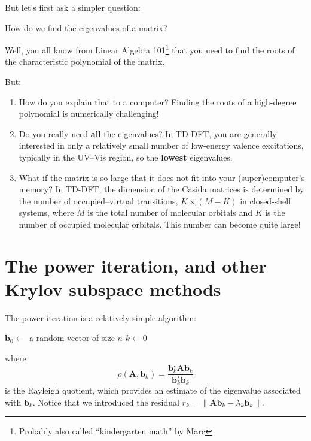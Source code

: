 \documentclass[10pt,aspectratio=169]{beamer}
\begin{document}
\begin{frame}
	But let's first ask a simpler question:
	\begin{center}
		\Large How do we find the eigenvalues of a matrix?
	\end{center}
	\pause
	Well, you all know from Linear Algebra 101\footnote{Probably also called ``kindergarten math'' by Marc} that you need to find the roots of the characteristic polynomial of the matrix.
	
	\medskip
	But:
	\begin{enumerate}
		\item How do you explain that to a computer? Finding the roots of a high-degree polynomial is numerically challenging!\pause
		\item Do you really need \textbf{all} the eigenvalues? In TD-DFT, you are generally interested in only a relatively small number of low-energy valence excitations, typically in the UV--Vis region, so the \textbf{lowest} eigenvalues.\pause
		\item What if the matrix is so large that it does not fit into your (super)computer's memory? In TD-DFT, the dimension of the Casida matrices is determined by the number of occupied--virtual transitions, $K\times (M-K)$ in closed-shell systems, where $M$ is the total number of molecular orbitals and $K$ is the number of occupied molecular orbitals. This number can become quite large!
	\end{enumerate}
\end{frame}

\section{The power iteration, and  other Krylov subspace methods}

\begin{frame}
	The power iteration is a relatively simple algorithm:
	\begin{algorithm}[H]
		\SetAlgoLined
		$\mathbf b_0 \gets$ a random vector of size $n$
		$k \gets 0$\;
		\;
	\end{algorithm}
	where
	\begin{equation*}
		\rho(\mathbf A,\mathbf b_k) = \frac{\mathbf b_k^\star\mathbf A\mathbf b_k}{\mathbf b_k^\star\mathbf b_k}
	\end{equation*}
	is the Rayleigh quotient, which provides an estimate of the eigenvalue associated with $\mathbf b_k$.
	Notice that we introduced the residual $r_k = \|\mathbf A\mathbf b_k-\lambda_k\mathbf b_k\|$.
\end{frame}
\end{document}
